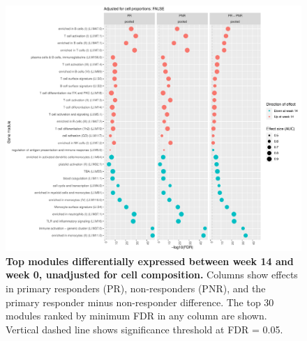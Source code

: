 \begin{figure}
    \centering
    \includegraphics[width=1.0\textwidth,page=1]{mainmatter/figures/chapter_04/plot_gene_set_enrichment.tmodCERNO_panelplot_reversed_C_3R_1R,C_3N_1N,C_(3R_1R)_(3N_1N).cell_prop_correction_FALSE.pdf}
    \caption{
        \textbf{Top modules differentially expressed between week 14 and week 0, unadjusted for cell composition.}
        Columns show effects in primary responders (PR), non-responders (PNR), and the primary responder minus non-responder difference. 
        The top 30 modules ranked by minimum \gls{FDR} in any column are shown. 
        Vertical dashed line shows significance threshold at FDR = 0.05.
    }
    \label{fig:multipants_dge_panelPlot_week_14_0_R_N_cellPropF}
\end{figure}

